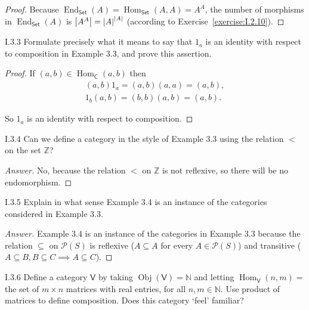 \begin{proof}
	Because $\operatorname{End}_{\mathsf{Set}}(A) = \operatorname{Hom}_{\mathsf{Set}}(A, A) = A^{A}$, the number of morphisms in $\operatorname{End}_{\mathsf{Set}}(A)$ is $\left\vert{A^{A}}\right\vert = {\left\vert{A}\right\vert}^{\left\vert{A}\right\vert}$ (according to Exercise~\ref{exercise:I.2.10}).
\end{proof}

\begin{exercise}{I.3.3}
	Formulate precisely what it means to say that $1_{a}$ is an identity with respect to composition in Example 3.3, and prove this assertion.
\end{exercise}

\begin{proof}
	If $(a, b)\in \operatorname{Hom}_{\mathsf{C}}(a, b)$ then
	\begin{align*}
		(a, b)1_{a} = (a, b)(a, a) = (a, b), \\
		1_{b}(a, b) = (b, b)(a, b) = (a, b).
	\end{align*}

	So $1_{a}$ is an identity with respect to composition.
\end{proof}

\begin{exercise}{I.3.4}
	Can we define a category in the style of Example 3.3 using the relation $<$ on the set $\mathbb{Z}$?
\end{exercise}

\begin{proof}[Answer]
	No, because the relation $<$ on $\mathbb{Z}$ is not reflexive, so there will be no endomorphism.
\end{proof}

\begin{exercise}{I.3.5}
	Explain in what sense Example 3.4 is an instance of the categories considered in Example 3.3.
\end{exercise}

\begin{proof}[Answer]
	Example 3.4 is an instance of the categories in Example 3.3 because the relation $\subseteq$ on $\mathscr{P}(S)$ is reflexive ($A\subseteq A$ for every $A\in \mathscr{P}(S)$) and transitive ($A\subseteq B, B\subseteq C \implies A\subseteq C$).
\end{proof}

\begin{exercise}{I.3.6}
	Define a category $\mathsf{V}$ by taking $\operatorname{Obj}(\mathsf{V}) = \mathbb{N}$ and letting $\operatorname{Hom}_{\mathsf{V}}(n, m) =$ the set of $m\times n$ matrices with real entries, for all $n, m\in\mathbb{N}$. Use product of matrices to define composition. Does this category `feel' familiar?
\end{exercise}

